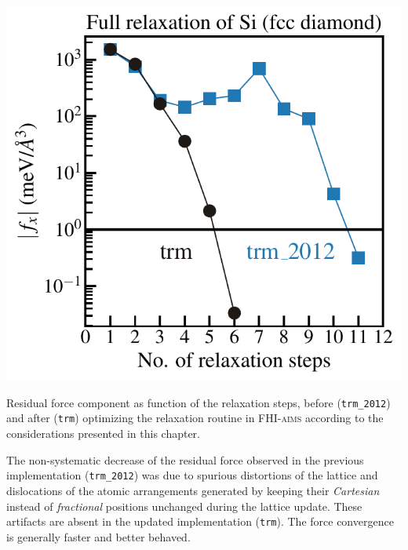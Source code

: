 \begin{marginfigure}
	\includegraphics[width=\textwidth]{./plots/relaxation/ltrm.pdf}
	\caption{Residual force component as function of the relaxation steps, before (\texttt{trm\_2012}) and after (\texttt{trm}) optimizing the relaxation routine in \textsc{FHI-aims} according to the considerations presented in this chapter.}
	\label{fig:ltrm}
\end{marginfigure}
The non-systematic decrease of the residual force observed in the previous implementation (\texttt{trm\_2012}) was due to spurious distortions of the lattice and dislocations of the atomic arrangements generated by keeping their \emph{Cartesian} instead of \emph{fractional} positions unchanged during the lattice update. These artifacts are absent in the updated implementation (\texttt{trm}). The force convergence is generally faster and better behaved.



